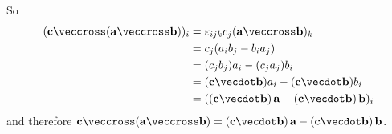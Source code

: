 \documentclass[fleqn,a4paper,11pt]{article}
\begin{document}
\begin{enumerate}[label=\textbf{\arabic*.}]
   So
   \begin{align*}
    (\vec c \veccross (\vec a \veccross \vec b))_i
     &= \epsilon_{ijk} c_j (\vec a \veccross \vec b)_k \\
     &= c_j (a_i b_j - b_i a_j) \\
     &= (c_j b_j) a_i - (c_j a_j) b_i \\
     &= (\vec c \vecdot \vec b) a_i - (\vec c \vecdot \vec b) b_i \\
     &= ((\vec c \vecdot \vec b)\,\vec a - (\vec c \vecdot \vec b)\,\vec b)_i
   \end{align*}
   and therefore
   \(\vec c \veccross (\vec a \veccross \vec b) =
     (\vec c \vecdot \vec b)\,\vec a - (\vec c \vecdot \vec b)\,\vec b\).
\end{enumerate}
\end{document}
